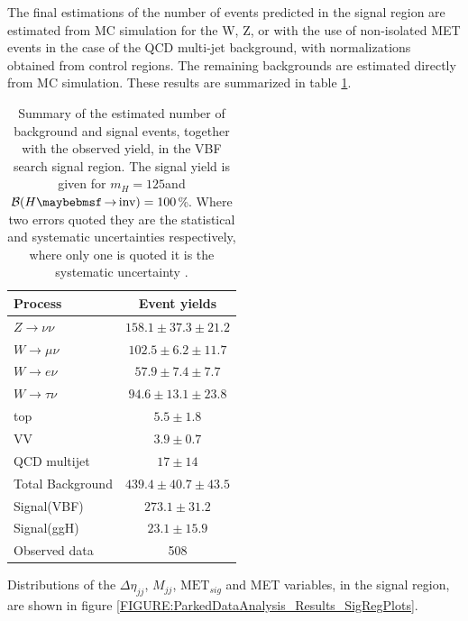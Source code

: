 
The final estimations of the number of events predicted in the signal region are estimated from \gls{MC} simulation for the W, Z, or with the use of non-isolated \gls{MET} events in the case of the \gls{QCD} multi-jet background, with normalizations obtained from control regions. The remaining backgrounds are estimated directly from \gls{MC} simulation. These results are summarized in table \ref{TABLE:ParkedDataAnalysis_Results_Summary}.

\begin{table}[!htb]
\centering
\begin{tabular}{|l|c|}
\hline 
Process & Event yields \\
\hline\hline
$Z\rightarrow\nu\nu$  & $158.1 \pm 37.3 \pm 21.2$ \\
$W\rightarrow\mu\nu$  & $102.5 \pm 6.2  \pm 11.7$ \\
$W\rightarrow e\nu$   & $ 57.9 \pm 7.4  \pm  7.7$ \\
$W\rightarrow\tau\nu$ & $ 94.6 \pm 13.1 \pm 23.8$ \\
top                   & $  5.5 \pm 1.8$           \\
VV                    & $  3.9 \pm 0.7$           \\
QCD multijet          & $ 17   \pm 14$            \\
\hline\hline
Total Background      & $439.4 \pm 40.7 \pm 43.5$ \\
\hline\hline
Signal(VBF)           & $273.1 \pm 31.2 $         \\
Signal(ggH)           & $ 23.1 \pm 15.9 $         \\
\hline\hline
Observed data         & 508                       \\
\hline
\end{tabular}
\caption{Summary of the estimated number of background and signal events, together with the observed yield, in the \gls{VBF} search signal region. The signal yield is given for $m_H=125$\GeV and $\BRinv=100$\%. Where two errors quoted they are the statistical and systematic uncertainties respectively, where only one is quoted it is the systematic uncertainty \cite{ARTICLE:CMSVBFHiggsInvisibleParkedAnalysisPAS}.}
\label{TABLE:ParkedDataAnalysis_Results_Summary}
\end{table}

Distributions of the $\Delta\eta_{jj}$, $M_{jj}$, $\text{MET}_{sig}$ and \gls{MET} variables, in the signal region, are shown in figure \ref{FIGURE:ParkedDataAnalysis_Results_SigRegPlots}. 

